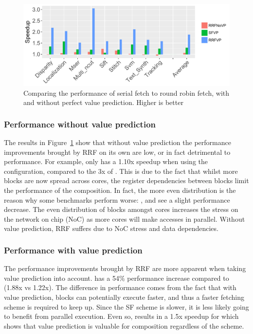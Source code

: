 \begin{figure}[t]
    \centering
    \includegraphics[width=1\textwidth]{chapter3/graphics/tempres4.pdf}
    \caption{Comparing the performance of serial fetch to round robin fetch, with and without perfect value prediction. Higher is better}
    \label{fig:perf_pred}
\end{figure}

\subsubsection{Performance without value prediction}
The results in Figure~\ref{fig:perf_pred} show that without value prediction the performance improvements brought by RRF on its own are low, or in fact detrimental to performance.
For example,  only has a 1.10x speedup when using the \nfnovp{} configuration, compared to the 3x of \nfvp{}.
This is due to the fact that whilst more blocks are now spread across cores, the register dependencies between blocks limit the performance of the composition. 
In fact, the more even distribution is the reason why some benchmarks perform worse: ,  and  see a slight performance decrease.
The even distribution of blocks amongst cores increases the stress on the network on chip (NoC) as more cores will make accesses in parallel.
Without value prediction, RRF suffers due to NoC stress and data dependencies.



\subsubsection{Performance with value prediction}
The performance improvements brought by RRF are more apparent when taking value prediction into account.
\nfvp{} has a 54\% performance increase compared to \vp{} (1.88x vs 1.22x).
The difference in performance comes from the fact that with value prediction, blocks can potentially execute faster, and thus a faster fetching scheme is required to keep up.
Since the SF scheme is slower, it is less likely going to benefit from parallel execution.
Even so, \vp{} results in a 1.5x speedup for  which shows that value prediction is valuable for composition regardless of the scheme.

